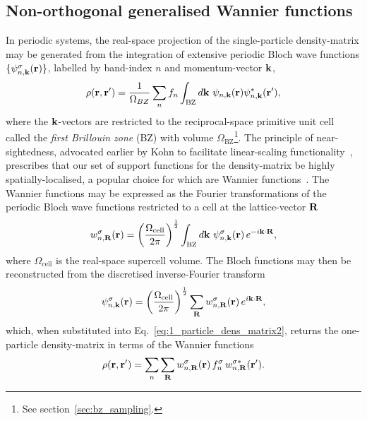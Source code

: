 \subsection{Non-orthogonal generalised Wannier functions}
\label{sec:ngwfs}

{
In periodic systems,  
the real-space projection of 
the single-particle density-matrix 
may be generated from the integration 
of extensive periodic Bloch wave functions 
$\{\psi_{n,{\bf k}}^\sigma({\bf r})\}$, 
labelled by band-index $n$ 
and momentum-vector ${\bf k}$, 
%
\begin{equation}
\rho(\br,\br')
=\frac{1}{\Omega_{BZ}}\sum_n f_n \int_{\textrm{BZ}} d\bk\ \psi_{n,\bk}(\br) \psi_{n,\bk}^*(\br'), 
\label{eq:1_particle_dens_matrix2}
\end{equation}
%
where the ${\bf k}$-vectors are 
restricted to the reciprocal-space 
primitive unit cell called  
the {\it first Brillouin zone} (BZ)
with volume $\Omega_\textrm{BZ}$\footnote{See section~\ref{sec:bz_sampling}.}.
%
The principle of near-sightedness, 
advocated earlier by Kohn 
to facilitate linear-scaling functionality~\cite{PhysRevLett.76.3168}, 
prescribes that our set of 
support functions for the density-matrix 
be highly spatially-localised,  
a popular choice for which 
are Wannier functions~\cite{PhysRev.52.191,
PhysRev.135.A685,
PhysRevLett.86.5341,
PhysRevLett.98.046402}.
%
The Wannier functions 
may be expressed as the 
Fourier transformations of the 
periodic Bloch wave functions 
restricted to a cell at the lattice-vector ${\bf R}$ 
%
\begin{equation}
w_{n,{\bf R}}^\sigma({\bf r})
=\left(\frac{\Omega_\textrm{cell}}{2\pi}\right)^\frac{1}{2}
\int_\textrm{BZ} d{\bf k}\
\psi_{n,{\bf k}}^\sigma({\bf r})\,
e^{-i{\bf k}\cdot{\bf R}}, 
\label{eq:wannier_function}
\end{equation}
%
where $\Omega_\textrm{cell}$ 
is the real-space supercell volume.
%
The Bloch functions 
may then be reconstructed 
from the discretised inverse-Fourier transform
%
\begin{equation}
\psi_{n,{\bf k}}^\sigma({\bf r})
=\left(\frac{\Omega_\textrm{cell}}{2\pi}\right)^\frac{1}{2}
\sum_{\bf R} 
w_{n,{\bf R}}^\sigma({\bf r})\,
e^{i{\bf k}\cdot{\bf R}}, 
\label{eq:psi_from_wannier_function}
\end{equation}
%
which, when substituted 
into Eq.~\eqref{eq:1_particle_dens_matrix2}, 
returns the one-particle density-matrix 
in terms of the Wannier functions 
%
\begin{equation}
\rho({\bf r},{\bf r}')
=\sum_n\sum_{\bf R} w^{\sigma}_{n,{\bf R}}({\bf r})\, f_n^\sigma\, w^{\sigma*}_{n,{\bf R}}({\bf r}').
\end{equation}}

